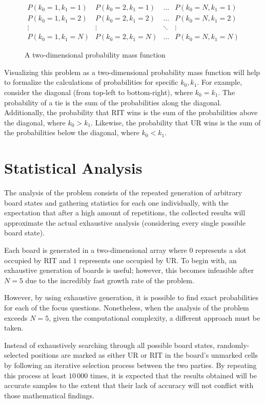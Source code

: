 \documentclass[12pt]{article}
\theoremstyle{definition}
\theoremstyle{theorem}
\begin{document}
\begin{figure}[H]
  $$
  \begin{matrix}
    P(k_0 = 1, k_1 = 1) & P(k_0 = 2, k_1 = 1) & \ldots & P(k_0 = N, k_1 = 1)\\
    P(k_0 = 1, k_1 = 2) & P(k_0 = 2, k_1 = 2) & \ldots & P(k_0 = N, k_1 = 2)\\
    \vdots & \vdots & \ddots & \vdots\\
    P(k_0 = 1, k_1 = N) & P(k_0 = 2, k_1 = N) & \ldots & P(k_0 = N, k_1 = N)
  \end{matrix}
  $$
  \caption{A two-dimensional probability mass function}
\end{figure}

Visualizing this problem as a two-dimensional probability mass function will help to formalize the calculations of probabilities for specific $k_0, k_1$. For example, consider the diagonal (from top-left to bottom-right), where $k_0 = k_1$. The probability of a tie is the sum of the probabilities along the diagonal. Additionally, the probability that RIT wins is the sum of the probabilities above the diagonal, where $k_0 > k_1$. Likewise, the probability that UR wins is the sum of the probabilities below the diagonal, where $k_0 < k_1$.

\section{Statistical Analysis}

The analysis of the problem consists of the repeated generation of arbitrary board states and gathering statistics for each one individually, with the expectation that after a high amount of repetitions, the collected results will approximate the actual exhaustive analysis (considering every single possible board state).

Each board is generated in a two-dimensional array where $0$ represents a slot occupied by RIT and $1$ represents one occupied by UR. To begin with, an exhaustive generation of boards is useful; however, this becomes infeasible after $N = 5$ due to the incredibly fast growth rate of the problem.

However, by using exhaustive generation, it is possible to find exact probabilities for each of the focus questions. Nonetheless, when the analysis of the problem exceeds $N = 5$, given the computational complexity, a different approach must be taken.

Instead of exhaustively searching through all possible board states, randomly-selected positions are marked as either UR or RIT in the board's unmarked cells by following an iterative selection process between the two parties. By repeating this process at least $10\,000$ times, it is expected that the results obtained will be accurate samples to the extent that their lack of accuracy will not conflict with those mathematical findings.
\end{document}
